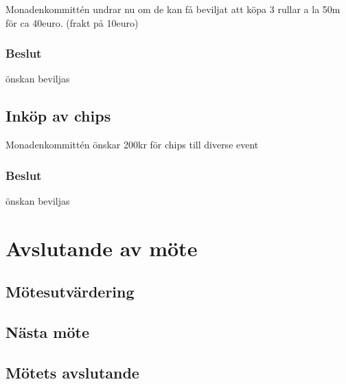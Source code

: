 \documentclass[protokoll]{dvd}
\begin{document}
        Monadenkommittén undrar nu om de kan få beviljat att köpa 3 rullar a la 50m för ca 40euro. (frakt på 10euro)

        \subsubsection{Beslut}
        \begin{attsatser}
            \item önskan beviljas
        \end{attsatser}

    \subsection{Inköp av chips}
        Monadenkommittén önskar 200kr för chips till diverse event

        \subsubsection{Beslut}
        \begin{attsatser}
            \item önskan beviljas
        \end{attsatser}

\newpage

\newpage

\section{Avslutande av möte}

    \subsection{Mötesutvärdering}

    \subsection{Nästa möte}

    \subsection{Mötets avslutande}

\styrelsesignaturer
\end{document}
